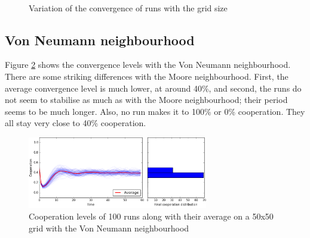 \documentclass[a4paper]{article}
\begin{document}
\begin{figure}[H]
	\centering
	\\
	\caption{Variation of the convergence of runs with the grid size}
	\label{pr_m_convs}
\end{figure}

\subsection{Von Neumann neighbourhood}
Figure \ref{vn50} shows the convergence levels with the Von Neumann
neighbourhood. There are some striking differences with the Moore neighbourhood.
First, the average convergence level is much lower, at around 40\%, and second,
the runs do not seem to stabilise as much as with the Moore neighbourhood; 
their period seems to be much longer. Also, no run makes it to 100\% or 0\%
cooperation. They all stay very close to 40\% cooperation. 

\begin{figure}[H]
	\centering
	\includegraphics[width=0.7\textwidth]{./fig/vn_50.png}
	\caption{Cooperation levels of 100 runs along with their average
	on a 50x50 grid with the Von Neumann neighbourhood}
	\label{vn50}
\end{figure}
\end{document}

